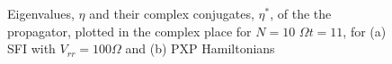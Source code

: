 \begin{figure}
  \centering
  \caption{Eigenvalues, $\eta$ and their complex conjugates, $\eta^*$,
    of the the propagator, plotted in the complex place for $N=10$
    $\Omega t=11$, for (a) SFI with $V_{rr}=100\Omega$ and (b) PXP
    Hamiltonians}
\end{figure}
